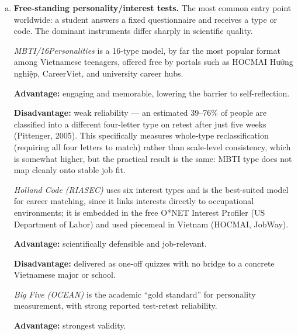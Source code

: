 \documentclass[a4paper]{article}
\begin{document}
\begin{enumerate}[a.]
    \setlength{\itemsep}{1em}
    \item \textbf{Free-standing personality/interest tests.} The most common entry point
    worldwide: a student answers a fixed questionnaire and receives a type or code. The
    dominant instruments differ sharply in scientific quality.

    \par\smallskip
    \textit{MBTI/16Personalities} is a 16-type model, by far the most popular format among
    Vietnamese teenagers, offered free by portals such as HOCMAI Hướng nghiệp, CareerViet, and
    university career hubs.

    \par\smallskip\noindent
    \textbf{Advantage:} engaging and memorable, lowering the barrier to self-reflection.

    \par\smallskip\noindent
    \textbf{Disadvantage:} weak reliability --- an estimated 39--76\% of
    people are classified into a different four-letter type on retest after just five weeks
    (Pittenger, 2005). This specifically measures whole-type reclassification (requiring all
    four letters to match) rather than scale-level consistency, which is somewhat higher, but
    the practical result is the same: MBTI type does not map cleanly onto stable job fit.

    \par\smallskip
    \textit{Holland Code (RIASEC)} uses six interest types and is the best-suited model for
    career matching, since it links interests directly to occupational environments; it is
    embedded in the free O*NET Interest Profiler (US Department of Labor) and used piecemeal
    in Vietnam (HOCMAI, JobWay).

    \par\smallskip\noindent
    \textbf{Advantage:} scientifically defensible and job-relevant.

    \par\smallskip\noindent
    \textbf{Disadvantage:} delivered as one-off quizzes with no bridge to a concrete Vietnamese
    major or school.

    \par\smallskip
    \textit{Big Five (OCEAN)} is the academic ``gold standard'' for
    personality measurement, with strong reported test-retest reliability.

    \par\smallskip\noindent
    \textbf{Advantage:} strongest validity.


\end{enumerate}
\end{document}
